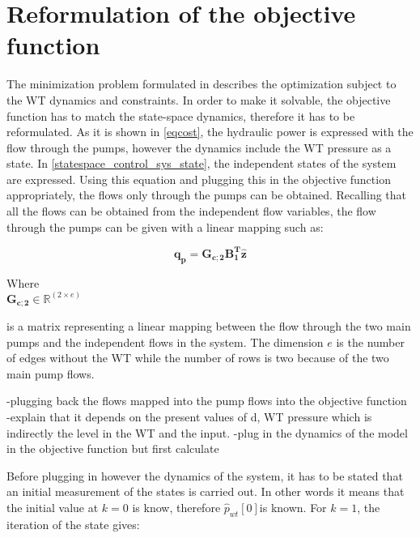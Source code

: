\section{Reformulation of the objective function}
\label{ObjFunc_reform}

The minimization problem formulated in  describes the optimization subject to the WT dynamics and constraints. In order to make it solvable, the objective function has to match the state-space dynamics, therefore it has to be reformulated. As it is shown in \eqref{eqcost}, the hydraulic power is expressed with the flow through the pumps, however the dynamics include the WT pressure as a state. In \eqref{statespace_control_sys_state}, the independent states of the system are expressed. Using this equation and plugging this in the objective function appropriately, the flows only through the pumps can be obtained. Recalling that all the flows can be obtained from the independent flow variables, the flow through the pumps can be given with a linear mapping such as: 

\begin{equation}
\pmb{q_p}  = \pmb{G_{c;2}} \pmb{B_1^T}  \pmb{\hat{z}}
\label{mapping_mainP}
\end{equation}


\begin{minipage}[t]{0.20\textwidth}
Where\\
\hspace*{8mm} $\pmb{G_{c;2}} \in \pmb{\mathbb{R}}^{(2 \times e)} $ 
\end{minipage}
\begin{minipage}[t]{0.68\textwidth}
\vspace*{2mm}
is a matrix representing a linear mapping between the flow through the two main pumps and the independent flows in the system. The dimension $e$ is the number of edges without the WT while the number of rows is two because of the two main pump flows. 
\end{minipage} 

-plugging back the flows mapped into the pump flows into the objective function
-explain that it depends on the present values of d, WT pressure which is indirectly the level in the WT and the input. 
-plug in the dynamics of the model in the objective function but first calculate 

Before plugging in however the dynamics of the system, it has to be stated that an initial measurement of the states is carried out. In other words it means that the initial value at $k = 0$ is know, therefore $\hat p_{wt}[0]$is known. For $k=1$, the iteration of the state gives:

